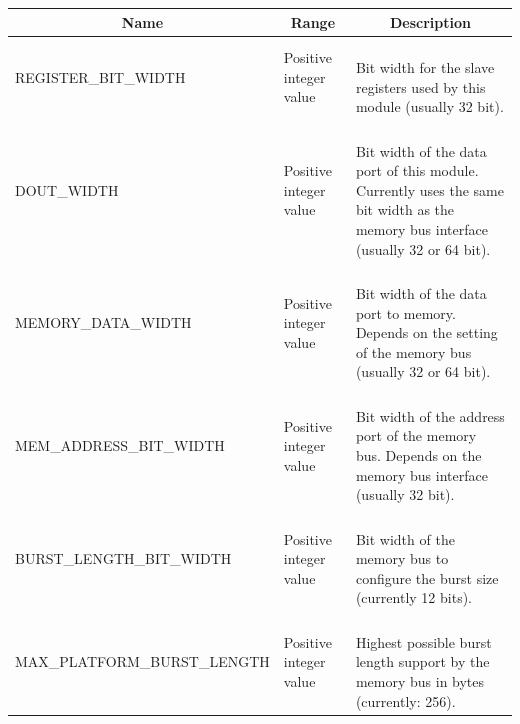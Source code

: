 \begin{longtable}[ht]{|l|l|l|}
    \hline
    \multicolumn{1}{|c|}{\textbf{Name}} & \multicolumn{1}{c|}{\textbf{Range}} & \multicolumn{1}{c|}{\textbf{Description}}\\
    \hline
    
    \small{REGISTER\_BIT\_WIDTH} & Positive integer value & \parbox{5cm}{\ \\
        Bit width for the slave registers used by this module (usually 32 bit).\vspace{0.3em}
    }\\
    \hline
    
    \small{DOUT\_WIDTH} & Positive integer value & \parbox{5cm}{\ \\
        Bit width of the data port of this module.\\
        Currently uses the same bit width as the memory bus interface (usually 32 or 64 bit).\vspace{0.3em}
    }\\
    \hline
    
    \small{MEMORY\_DATA\_WIDTH} & Positive integer value & \parbox{5cm}{\ \\
        Bit width of the data port to memory.\\
        Depends on the setting of the memory bus (usually 32 or 64 bit).\vspace{0.3em}
    }\\
    \hline
    
    \small{MEM\_ADDRESS\_BIT\_WIDTH} & Positive integer value & \parbox{5cm}{\ \\
        Bit width of the address port of the memory bus.
        Depends on the memory bus interface (usually 32 bit).\vspace{0.3em}
    }\\
    \hline
    
    \small{BURST\_LENGTH\_BIT\_WIDTH} & Positive integer value & \parbox{5cm}{\ \\
        Bit width of the memory bus to configure the burst size (currently 12 bits).\vspace{0.3em}
    }\\
    \hline
    
    \small{MAX\_PLATFORM\_BURST\_LENGTH} & Positive integer value & \parbox{5cm}{\ \\
        Highest possible burst length support by the memory bus in bytes (currently: 256).\vspace{0.3em}
    }\\
    \hline
    

\end{longtable}
